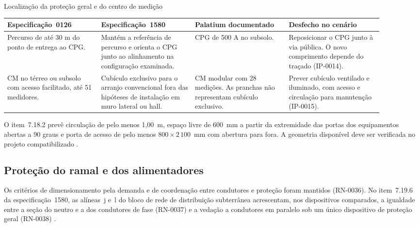 \begin{quadro}[!htbp]
\centering
\caption{Localização da proteção geral e do centro de medição}\label{qua:espaco-caso}
{\small\setlength{\tabcolsep}{3pt}\renewcommand{\arraystretch}{1.14}
\begin{tabular}{|*{4}{>{\raggedright\arraybackslash}p{0.225\linewidth}|}}\hline
\textbf{Especificação~0126} & \textbf{Especificação~1580} & \textbf{Palatium documentado} & \textbf{Desfecho no cenário} \\\hline
Percurso de até 30 m do ponto de entrega ao CPG. & Mantém a referência de percurso e orienta o CPG junto ao alinhamento na configuração examinada. & CPG de 500 A no subsolo. & Reposicionar o CPG junto à via pública. O novo comprimento depende do traçado (IP-0014). \\\hline
CM no térreo ou subsolo com acesso facilitado, até 51 medidores. & Cubículo exclusivo para o arranjo convencional fora das hipóteses de instalação em muro lateral ou hall. & CM modular com 28 medições. As pranchas não representam cubículo exclusivo. & Prever cubículo ventilado e iluminado, com acesso e circulação para manutenção (IP-0015). \\\hline
\end{tabular}}
\end{quadro}

O item~7.18.2 prevê circulação de pelo menos 1,00~m, espaço livre de 600~mm a partir da extremidade das portas dos equipamentos abertas a 90 graus e porta de acesso de pelo menos \(800\times2\,100\)~mm com abertura para fora. A geometria disponível deve ser verificada no projeto compatibilizado \cite[item~7.18.2]{enel1580}.

\subsection{Proteção do ramal e dos alimentadores}\label{subsec:impacto-condutores-protecao}

Os critérios de dimensionamento pela demanda e de coordenação entre condutores e proteção foram mantidos (RN-0036). No item~7.19.6 da especificação~1580, as alíneas~j e~l do bloco de rede de distribuição subterrânea acrescentam, nos dispositivos comparados, a igualdade entre a seção do neutro e a dos condutores de fase (RN-0037) e a vedação a condutores em paralelo sob um único dispositivo de proteção geral (RN-0038) \cite[itens~7.6.1.4 e~7.7.8.1.1]{enel0126}\cite[item~7.19.6]{enel1580}.

